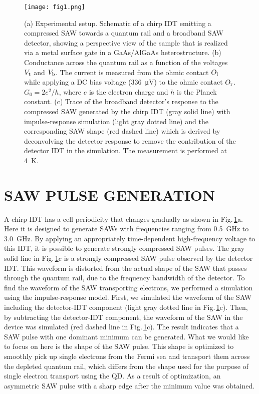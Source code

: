 \documentclass{article}
\begin{document}
\begin{figure}
\centering
\texttt{[image: fig1.png]}
\caption{\label{fig:Figure1}(a) Experimental setup. Schematic of a chirp IDT emitting a compressed SAW towards a quantum rail and a broadband SAW detector, showing a perspective view of the sample that is realized via a metal surface gate in a GaAs/AlGaAs heterostructure. (b) Conductance across the quantum rail as a function of the voltages $V_{\rm t}$ and $V_{\rm b}$. The current is measured from the ohmic contact $O_{\rm l}$ while applying a DC bias voltage (\SI{336}{\micro V}) to the ohmic contact $O_{\rm r}$. $G_0 = 2e^{2}/h$, where $e$ is the electron charge and $h$ is the Planck constant. (c) Trace of the broadband detector's response to the compressed SAW generated by the chirp IDT (gray solid line) with impulse-response simulation (light gray dotted line) and the corresponding SAW shape (red dashed line) which is derived by deconvolving the detector response to remove the contribution of the detector IDT in the simulation. The measurement is performed at \SI{4}{K}.}
\end{figure}

\section{SAW PULSE GENERATION}
A chirp IDT \cite{JW_PRX2022} has a cell periodicity that changes gradually as shown in Fig.\,\ref{fig:Figure1}a.
Here it is designed to generate SAWs with frequencies ranging from \SI{0.5}{GHz} to \SI{3.0}{GHz}. 
By applying an appropriately time-dependent high-frequency voltage to this IDT, it is possible to generate strongly compressed SAW pulses. 
The gray solid line in Fig.\,\ref{fig:Figure1}c is a strongly compressed SAW pulse observed by the detector IDT. 
This waveform is distorted from the actual shape of the SAW that passes through the quantum rail, due to the frequency bandwidth of the detector. 
To find the waveform of the SAW transporting electrons, we performed a simulation using the impulse-response model. 
First, we simulated the waveform of the SAW including the detector-IDT component (light gray dotted line in Fig.\,\ref{fig:Figure1}c). 
Then, by subtracting the detector-IDT component, the waveform of the SAW in the device was simulated (red dashed line in Fig.\,\ref{fig:Figure1}c). The result indicates that a SAW pulse with one dominant minimum can be generated. 
What we would like to focus on here is the shape of the SAW pulse. This shape is optimized to smoothly pick up single electrons from the Fermi sea and transport them across the depleted quantum rail, which differs from the shape used for the purpose of single electron transport using the QD. As a result of optimization, an asymmetric SAW pulse with a sharp edge after the minimum value was obtained.
\end{document}
